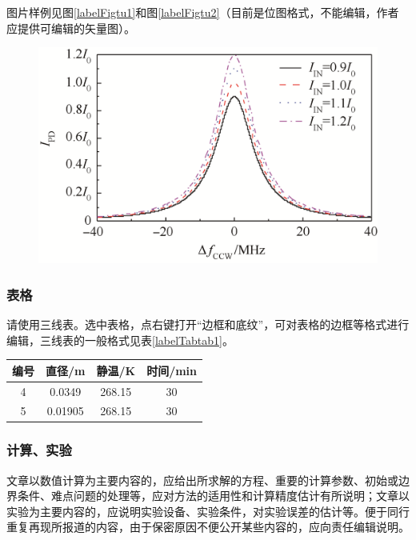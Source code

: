 \documentclass[10.5pt,twocolumn]{jbuaa}
\begin{document}
 图片样例见图\ref{labelFigtu1}和图\ref{labelFigtu2}（目前是位图格式，不能编辑，作者应提供可编辑的矢量图）。
 \begin{figure}[h!]
 \centering
 \includegraphics [scale=1,trim=0 0 0 0]{./image/tu2.png}
 \end{figure}
 \subsubsection{表格}
 请使用三线表。选中表格，点右键打开``边框和底纹”，可对表格的边框等格式进行编辑，三线表的一般格式见表\ref{labelTabtab1}。
 \begin{table}[h]
 \centering
 \captionnamefont{\xiaowuhao\bf }
 \captiontitlefont{\xiaowuhao\bf }
 \renewcommand\tabcolsep{1em}
 \begin{tabular}{cccc}
 \toprule
 {编号} &  {直径}/\si{\metre} & {静温}/\si{\kelvin} & {时间}/min\\
 \midrule 
 4 & 0.0349 & 268.15 & 30\\
 5 & 0.01905 & 268.15 & 30\\
 \bottomrule
 \end{tabular}
 \end{table}
 \subsubsection{计算、实验}
 文章以数值计算为主要内容的，应给出所求解的方程、重要的计算参数、初始或边界条件、难点问题的处理等，应对方法的适用性和计算精度估计有所说明；文章以实验为主要内容的，应说明实验设备、实验条件，对实验误差的估计等。便于同行重复再现所报道的内容，由于保密原因不便公开某些内容的，应向责任编辑说明。
\end{document}
